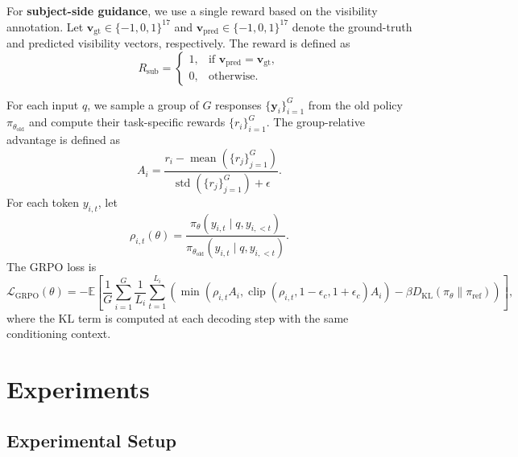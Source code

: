 \documentclass{article} %
\begin{document}
For \textbf{subject-side guidance}, we use a single reward based on the visibility annotation. Let $\mathbf{v}_{\text{gt}} \in \{-1,0,1\}^{17}$ and $\mathbf{v}_{\text{pred}} \in \{-1,0,1\}^{17}$ denote the ground-truth and predicted visibility vectors, respectively. The reward is defined as
\begin{equation}
R_{\text{sub}} =
\begin{cases}
1, & \text{if } \mathbf{v}_{\text{pred}} = \mathbf{v}_{\text{gt}}, \\
0, & \text{otherwise}.
\end{cases}
\end{equation}

For each input $q$, we sample a group of $G$ responses
$\{\mathbf{y}_i\}_{i=1}^{G}$ from the old policy $\pi_{\theta_{\mathrm{old}}}$ and compute their
task-specific rewards $\{r_i\}_{i=1}^{G}$. The group-relative advantage is defined as
\begin{equation}
A_i =
\frac{r_i-\operatorname{mean}(\{r_j\}_{j=1}^{G})}
{\operatorname{std}(\{r_j\}_{j=1}^{G})+\epsilon}.
\end{equation}
For each token $y_{i,t}$, let
\begin{equation}
\rho_{i,t}(\theta)
=
\frac{
\pi_{\theta}(y_{i,t}\mid q,y_{i,<t})
}{
\pi_{\theta_{\mathrm{old}}}(y_{i,t}\mid q,y_{i,<t})
}.
\end{equation}
The GRPO loss is
\begin{equation}
\mathcal{L}_{\mathrm{GRPO}}(\theta)
=
-
\mathbb{E}
\left[
\frac{1}{G}
\sum_{i=1}^{G}
\frac{1}{L_i}
\sum_{t=1}^{L_i}
\left(
\min
\left(
\rho_{i,t} A_i,
\operatorname{clip}(\rho_{i,t},1-\epsilon_c,1+\epsilon_c) A_i
\right)
-
\beta
D_{\mathrm{KL}}
\left(
\pi_{\theta}
\|
\pi_{\mathrm{ref}}
\right)
\right)
\right],
\end{equation}
where the KL term is computed at each decoding step with the same conditioning context.

\section{Experiments}
\label{sec:experiments}
\subsection{Experimental Setup}
\end{document}
